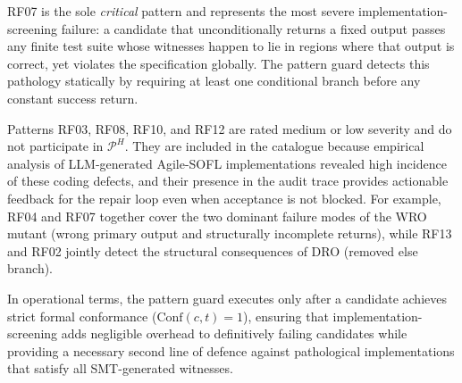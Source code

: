 \begin{table}[htbp]
  \caption{Patterns associated with implementation-screening faults.}
  \label{tab:pat:impl-screening}
  \centering
\end{table}

RF07 is the sole \emph{critical} pattern and represents the most severe
implementation-screening failure: a candidate that unconditionally returns a
fixed output passes any finite test suite whose witnesses happen to lie in
regions where that output is correct, yet violates the specification globally.
The pattern guard detects this pathology statically by requiring at least one
conditional branch before any constant success return.

Patterns RF03, RF08, RF10, and RF12 are rated medium or low severity and do
not participate in $\mathcal{P}^H$.  They are included in the catalogue because
empirical analysis of LLM-generated Agile-SOFL implementations revealed high
incidence of these coding defects, and their presence in the audit trace
provides actionable feedback for the repair loop even when acceptance is not
blocked.  For example, RF04 and RF07 together cover the two dominant failure
modes of the WRO mutant (wrong primary output and structurally incomplete
returns), while RF13 and RF02 jointly detect the structural consequences of
DRO (removed else branch).

In operational terms, the pattern guard executes only after a candidate
achieves strict formal conformance ($\mathrm{Conf}(c,t) = 1$), ensuring that
implementation-screening adds negligible overhead to definitively failing
candidates while providing a necessary second line of defence against
pathological implementations that satisfy all SMT-generated witnesses.
